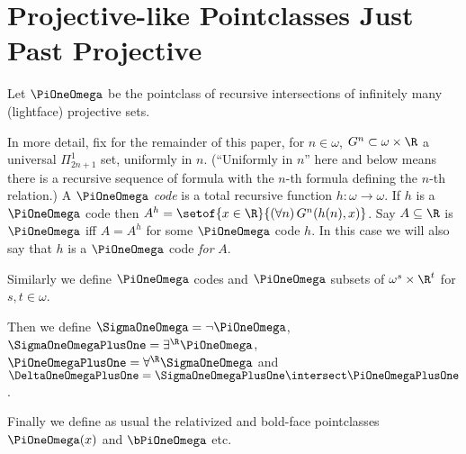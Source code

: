 \documentclass[oneside,12pt]{amsart}
\begin{document}
\section{Projective-like Pointclasses Just Past Projective}
\label{section:projectivelikepointclasses}

\begin{definition}
Let $\PiOneOmega$ be the pointclass of recursive intersections of infinitely many (lightface) projective sets.

In more detail, fix for the remainder of this paper, for $n\in\omega$, $G^n\subset\omega\times\R$
a universal $\Pi^1_{2n+1}$ set, uniformly in $n$. (``Uniformly in $n$'' here and below
means there is a recursive sequence of formula with the $n$-th formula defining the $n$-th relation.)
A $\PiOneOmega$ \emph{code} is a total recursive function $h:\omega\to\omega$. If $h$ is a $\PiOneOmega$ code then
$A^h=\setof{x\in\R}{(\forall n)\, G^n(h(n),x)}$. Say $A\subseteq\R$ is $\PiOneOmega$ iff
$A=A^h$ for some $\PiOneOmega$ code $h$. In this case we will also say that $h$
is a $\PiOneOmega$ code \emph{for} $A$.

Similarly we define $\PiOneOmega$ codes and $\PiOneOmega$ subsets of $\omega^s\times \R^t$ for $s,t\in\omega$.

Then we define $\SigmaOneOmega = \neg\PiOneOmega$, $\SigmaOneOmegaPlusOne=\exists^{\R}\PiOneOmega$,
$\PiOneOmegaPlusOne = \forall^{\R}\SigmaOneOmega$ and
$\DeltaOneOmegaPlusOne = \SigmaOneOmegaPlusOne \intersect \PiOneOmegaPlusOne$.

Finally we define as usual the relativized and bold-face
pointclasses $\PiOneOmega(x)$
and $\bPiOneOmega$ etc.
\end{definition}
\end{document}
